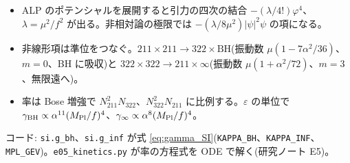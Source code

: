 \begin{summary}
\begin{itemize}
\item ALP のポテンシャルを展開すると引力の四次の結合 $-(\lambda/4!)\varphi^4$、$\lambda=\mu^2/f^2$ が出る。非相対論の極限では $-(\lambda/8\mu^2)|\psi|^2\psi$ の項になる。
\item 非線形項は準位をつなぐ。$211\times211\to322\times\mathrm{BH}$(振動数 $\mu(1-7\alpha^2/36)$、$m=0$、BH に吸収)と $322\times322\to211\times\infty$(振動数 $\mu(1+\alpha^2/72)$、$m=3$、無限遠へ)。
\item 率は Bose 増強で $N_{211}^2N_{322}$、$N_{322}^2N_{211}$ に比例する。$\varepsilon$ の単位で $\gamma_\mathrm{BH}\propto\alpha^{11}(M_\mathrm{Pl}/f)^4$、$\gamma_\infty\propto\alpha^8(M_\mathrm{Pl}/f)^4$。
\end{itemize}
\end{summary}

\begin{tocode}
コード: \texttt{si.g\_bh}、\texttt{si.g\_inf} が式 \eqref{eq:gamma_SI}(\texttt{KAPPA\_BH}、\texttt{KAPPA\_INF}、\texttt{MPL\_GEV})。\texttt{e05\_kinetics.py} が率の方程式を ODE で解く(研究ノート E5)。
\end{tocode}
